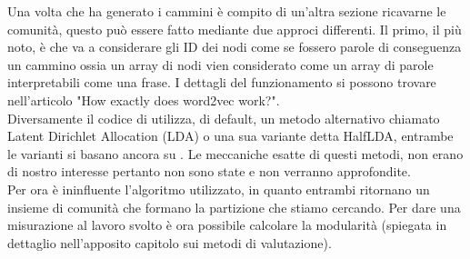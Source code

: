 %
Una volta che \nv ha generato i cammini è compito di un'altra sezione ricavarne le comunità, questo può essere fatto mediante due approci differenti. Il primo, il più noto, è \wv che va a considerare gli ID dei nodi come se fossero parole di conseguenza un cammino ossia un array di nodi vien considerato come un array di parole interpretabili come una frase. I dettagli del funzionamento si possono trovare nell'articolo "How exactly does word2vec work?"\cite{W2V_paper}.\\
Diversamente il codice di \cnrl utilizza, di default, un metodo alternativo chiamato Latent Dirichlet Allocation (LDA)\cite{LDA} o una sua variante detta HalfLDA, entrambe le varianti si basano ancora su \wv. Le meccaniche esatte di questi metodi, non erano di nostro interesse pertanto non sono state e non verranno approfondite.\\
Per ora è ininfluente l'algoritmo utilizzato, in quanto entrambi ritornano un insieme di comunità che formano la partizione che stiamo cercando. Per dare una misurazione al lavoro svolto è ora possibile calcolare la modularità (spiegata in dettaglio nell'apposito capitolo sui metodi di valutazione).
%
